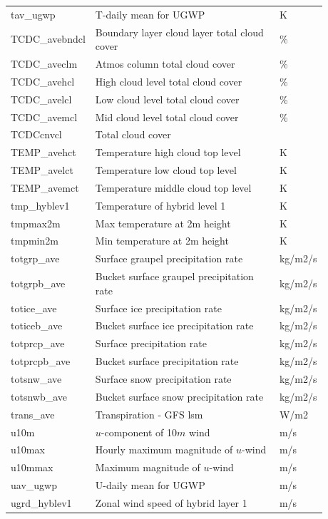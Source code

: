 \documentclass[11pt,fleqn]{report}              %
\begin{document}
\begin{enumerate}
\begin{enumerate}
{\begin{longtable}{p{0.17\linewidth} | p{0.6\linewidth} | p{0.11\linewidth} }
tav\_ugwp & T-daily mean for UGWP & K \\
TCDC\_avebndcl  & Boundary layer cloud layer total cloud cover & \%  \\
TCDC\_aveclm  & Atmos column total cloud cover & \%   \\
TCDC\_avehcl  & High cloud level total cloud cover & \% \\
TCDC\_avelcl  & Low cloud level total cloud cover & \%  \\
TCDC\_avemcl  & Mid cloud level total cloud cover & \%  \\
TCDCcnvcl  & Total cloud cover &\\
TEMP\_avehct  & Temperature high cloud top level & K  \\
TEMP\_avelct  & Temperature low cloud top level & K  \\
TEMP\_avemct  & Temperature middle cloud top level & K  \\
tmp\_hyblev1 & Temperature of hybrid level 1 & K  \\
tmpmax2m  & Max temperature at 2m height & K \\
tmpmin2m  & Min temperature at 2m height & K  \\
totgrp\_ave  & Surface graupel precipitation rate & kg/m2/s  \\
totgrpb\_ave  & Bucket surface graupel precipitation rate & kg/m2/s \\
totice\_ave  & Surface ice precipitation rate & kg/m2/s  \\
toticeb\_ave  & Bucket surface ice precipitation rate & kg/m2/s  \\
totprcp\_ave  & Surface precipitation rate & kg/m2/s \\
totprcpb\_ave  & Bucket surface precipitation rate & kg/m2/s  \\
totsnw\_ave  & Surface snow precipitation rate & kg/m2/s  \\
totsnwb\_ave  & Bucket surface snow precipitation rate & kg/m2/s  \\
trans\_ave  & Transpiration - GFS lsm & W/m2 \\
u10m & $u$-component of 10$m$ wind & m/s  \\
u10max  & Hourly maximum magnitude of $u$-wind & m/s \\
u10mmax  & Maximum magnitude of $u$-wind & m/s  \\
uav\_ugwp & U-daily mean for UGWP & m/s \\
ugrd\_hyblev1  & Zonal wind speed of hybrid layer 1 & m/s  \\

\end{longtable}}
\end{enumerate}
\end{enumerate}
\end{document}
